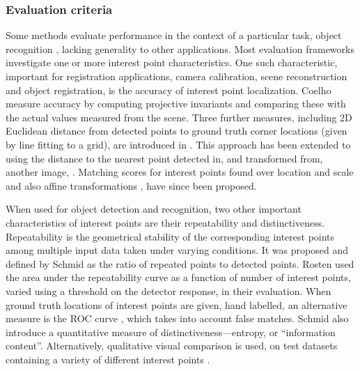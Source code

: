 \subsubsection{Evaluation criteria}
Some methods evaluate performance in the context of a particular task, \eg object recognition \cite{Shin1999,Dutagaci2011}, 
lacking generality to other applications. Most evaluation frameworks investigate one or more interest point characteristics. 
One such characteristic, important for registration applications, \eg camera calibration, scene reconstruction and object registration, is the accuracy of interest point localization. 
Coelho \etal \cite{Coelho1992} measure accuracy by computing projective invariants and comparing these with the actual values measured from the scene. Three further measures, including 2D Euclidean distance from detected points to ground truth corner locations (given by line fitting to a grid), are introduced in \cite{Brand1994}. This approach has been extended to using the distance to the nearest point detected in, and transformed from, another image, \eg \cite{Schmid2000}. Matching scores for interest points found over location and scale \cite{Laptev2003}
and also affine transformations \cite{Mikolajczyk2004}, have since been proposed.

When used for object detection and recognition, two other important characteristics of interest points are their repeatability and distinctiveness. 
Repeatability is the geometrical stability of the corresponding interest points among multiple input data taken under varying conditions. 
It was proposed and defined by Schmid \etal \cite{Schmid2000} as the ratio of repeated points to detected points. 
Rosten \etal \cite{Rosten2010} used the area under the repeatability curve as a function of number of interest points, varied using a threshold on the detector response, in their evaluation. 
When ground truth locations of interest points are given, \eg hand labelled, an alternative measure is the ROC curve \cite{Bowyer1999}, which takes into account false matches.
Schmid \etal \cite{Schmid2000} also introduce a quantitative measure of distinctiveness---entropy, or ``information content''.
Alternatively, qualitative visual comparison is used, on test datasets containing a variety of different interest points \cite{Lindeberg1998,Laptev2005}.

